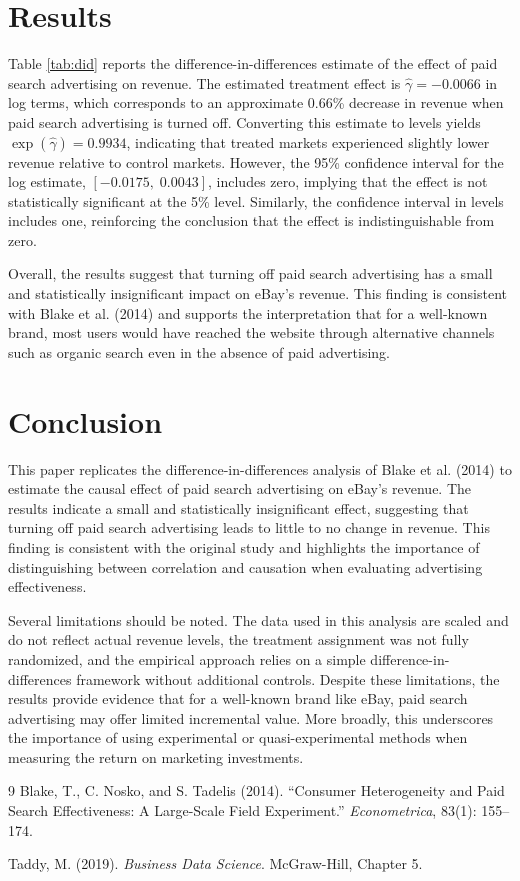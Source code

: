 \documentclass[12pt]{article}
\begin{document}
\section{Results}


Table \ref{tab:did} reports the difference-in-differences estimate of the effect of paid search advertising on revenue. The estimated treatment effect is $\hat{\gamma} = -0.0066$ in log terms, which corresponds to an approximate 0.66\% decrease in revenue when paid search advertising is turned off. Converting this estimate to levels yields $\exp(\hat{\gamma}) = 0.9934$, indicating that treated markets experienced slightly lower revenue relative to control markets. However, the 95\% confidence interval for the log estimate, $[-0.0175, \; 0.0043]$, includes zero, implying that the effect is not statistically significant at the 5\% level. Similarly, the confidence interval in levels includes one, reinforcing the conclusion that the effect is indistinguishable from zero.

Overall, the results suggest that turning off paid search advertising has a small and statistically insignificant impact on eBay’s revenue. This finding is consistent with Blake et al. (2014) and supports the interpretation that for a well-known brand, most users would have reached the website through alternative channels such as organic search even in the absence of paid advertising.

\section{Conclusion}
This paper replicates the difference-in-differences analysis of Blake et al. (2014) to estimate the causal effect of paid search advertising on eBay’s revenue. The results indicate a small and statistically insignificant effect, suggesting that turning off paid search advertising leads to little to no change in revenue. This finding is consistent with the original study and highlights the importance of distinguishing between correlation and causation when evaluating advertising effectiveness.

Several limitations should be noted. The data used in this analysis are scaled and do not reflect actual revenue levels, the treatment assignment was not fully randomized, and the empirical approach relies on a simple difference-in-differences framework without additional controls. Despite these limitations, the results provide evidence that for a well-known brand like eBay, paid search advertising may offer limited incremental value. More broadly, this underscores the importance of using experimental or quasi-experimental methods when measuring the return on marketing investments.

\begin{thebibliography}{9}
Blake, T., C. Nosko, and S. Tadelis (2014).
``Consumer Heterogeneity and Paid Search Effectiveness: A Large-Scale Field Experiment.''
\textit{Econometrica}, 83(1): 155--174.

Taddy, M. (2019).
\textit{Business Data Science}. McGraw-Hill, Chapter 5.
\end{thebibliography}
\end{document}
